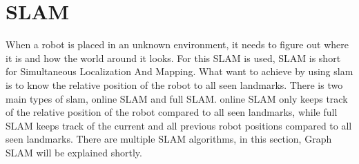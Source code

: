 \section{SLAM}
When a robot is placed in an unknown environment, it needs to figure out where it is and how the world around it looks. For this SLAM is used, SLAM is short for Simultaneous Localization And Mapping. 
What want to achieve by using slam is to know the relative position of the robot to all seen landmarks. There is two main types of slam, online SLAM and full SLAM. online SLAM only keeps track of the relative position of the robot compared to all seen landmarks, while full SLAM keeps track of the current and all previous robot positions compared to all seen landmarks.
There are multiple SLAM algorithms, in this section, Graph SLAM will be explained shortly.

